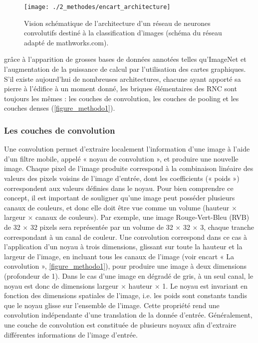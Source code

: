 \begin{sidewaysfigure}
\begin{figure}[H]
	\begin{center}
	\texttt{[image: ./2\_methodes/encart\_architecture]}
		\caption[Vision schématique de l’architecture d’un réseau de neurones convolutifs destiné à la classification d’images]{Vision schématique de l’architecture d’un réseau de neurones convolutifs destiné à la classification d’images (schéma du réseau adapté de mathworks.com).}
	\label{figure_methodo1}
\end{center}
\end{figure}
\end{sidewaysfigure}

\noindent grâce à l’apparition de grosses bases de données annotées telles qu’ImageNet \citep{deng_imagenet:_2009} et l’augmentation de la puissance de calcul par l’utilisation des cartes graphiques. S’il existe aujourd’hui de nombreuses architectures, chacune ayant apporté sa pierre à l’édifice à un moment donné, les briques élémentaires des RNC sont toujours les mêmes : les couches de convolution, les couches de pooling et les couches denses \citep{lecun_deep_2015} (\autoref{figure_methodo1}).

\subsubsection{Les couches de convolution}

Une convolution permet d’extraire localement l’information d’une image à l’aide d’un filtre mobile, appelé « noyau de convolution », et produire une nouvelle image. Chaque pixel de l’image produite correspond à la combinaison linéaire des valeurs des pixels voisins de l’image d’entrée, dont les coefficients (« poids ») correspondent aux valeurs définies dans le noyau. Pour bien comprendre ce concept, il est important de souligner qu’une image peut posséder plusieurs canaux de couleurs, et donc elle doit être vue comme un volume (hauteur × largeur × canaux de couleurs). Par exemple, une image Rouge-Vert-Bleu (RVB) de 32 $\times$ 32 pixels sera représentée par un volume de 32 $\times$ 32 $\times$ 3, chaque tranche correspondant à un canal de couleur. Une convolution correspond dans ce cas à l’application d’un noyau à trois dimensions, glissant sur toute la hauteur et la largeur de l’image, en incluant tous les canaux de l’image (voir encart « La convolution », \autoref{figure_methodo1}), pour produire une image à deux dimensions (profondeur de 1). Dans le cas d’une image en dégradé de gris, à un seul canal, le noyau est donc de dimensions largeur $\times$ hauteur $\times$ 1. Le noyau est invariant en fonction des dimensions spatiales de l’image, i.e. les poids sont constants tandis que le noyau glisse sur l’ensemble de l’image. Cette propriété rend une convolution indépendante d’une translation de la donnée d’entrée. Généralement, une couche de convolution est constituée de plusieurs noyaux afin d’extraire différentes informations de l’image d’entrée.

